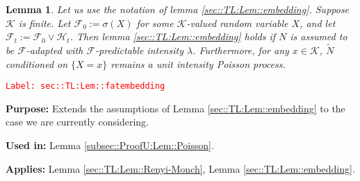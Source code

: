 \documentclass[12pt]{article}
\newcommand{\mc}{\mathcal}
\newcommand{\tr}{\textcolor{red}}
\newcommand{\labe}[1]{\tr{\texttt{Label: #1}}}
\newcommand{\purpose}{\textbf{Purpose: }}
\newcommand{\usein}{\textbf{Used in: }}
\newcommand{\app}{\textbf{Applies: }}
\newcommand{\defeq}{:=}								%
\newcommand{\x}{x}								%
\renewcommand{\t}{t}							%
\newcommand{\F}{\mc{F}}							%
\newcommand{\FH}{\mc{H}}						%
\newcommand{\X}{X}								%
\newcommand{\ts}[1]{_{#1}}						%
\newcommand{\poiss}{N}							%
\newcommand{\rate}{\lambda}						%
\newcommand{\alt}[1]{\widetilde{#1}}			%
\newcommand{\mspce}{\mc{K}}						%
\newtheorem{lem}[thms]{Lemma}
\begin{document}
\begin{lem}
Let us use the notation of lemma \ref{sec::TL:Lem::embedding}. Suppose \(\mspce\) is finite. Let \(\F\ts{0} \defeq \sigma(\X)\) for some \(\mspce\)-valued random variable \(\X\), and let \(\F\ts{\t}\defeq \F\ts{0}\vee\FH\ts{\t}\). Then lemma \ref{sec::TL:Lem::embedding} holds if \(\poiss\) is assumed to be \(\F\)-adapted with \(\F\)-predictable intensity \(\rate\). Furthermore, for any \(\x\in \mspce\), \(\alt{\poiss}\) conditioned on \(\{\X = \x\}\) remains a unit intensity Poisson process.
\label{sec::TL:Lem::fatembedding}
\end{lem}
\labe{sec::TL:Lem::fatembedding}

\purpose Extends the assumptions of Lemma \ref{sec::TL:Lem::embedding} to the case we are currently considering.

\usein Lemma \ref{subsec::ProofU:Lem::Poisson}.

\app Lemma \ref{sec::TL:Lem::Renyi-Monch}, Lemma \ref{sec::TL:Lem::embedding}.
\end{document}
